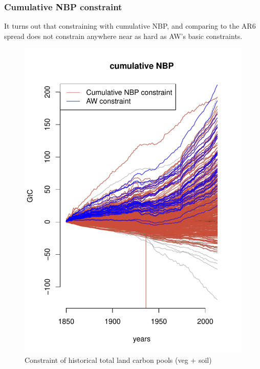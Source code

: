 \documentclass[gmd, manuscript]{copernicus}
\begin{document}
\subsubsection{Cumulative NBP constraint}

It turns out that constraining with cumulative NBP, and comparing to the AR6 spread does not constrain anywhere near as hard as AW's basic constraints.

\begin{figure}[t]
\includegraphics[width=12cm]{./graphics/cumulative_nbp_constrained.pdf}
\caption{Constraint of historical total land carbon pools (veg + soil)}
\label{fig:total-land-carbon-sink-1}
\end{figure}
\end{document}
